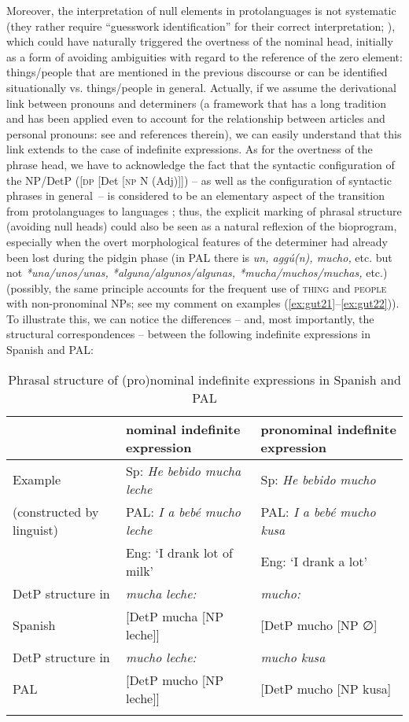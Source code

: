 \documentclass[output=paper,colorlinks,citecolor=brown]{langscibook}
\begin{document}
Moreover, the interpretation of null elements in protolanguages is not systematic (they rather require “guesswork identification” for their correct interpretation; \cite[][169]{Bickerton1990}), which could have naturally triggered the overtness of the nominal head, initially as a form of avoiding ambiguities with regard to the reference of the zero element: things/people that are mentioned in the previous discourse or can be identified situationally vs. things\slash people in general. Actually, if we assume the derivational link between pronouns and determiners (a framework that has a long tradition and has been applied even to account for the relationship between articles and personal pronouns: see \cite[][48--51, 179--191]{Bosque1989} and references therein), we can easily understand that this link extends to the case of indefinite expressions. As for the overtness of the phrase head, we have to acknowledge the fact that the syntactic configuration of the NP/DetP ([\textsc{dp} [Det [\textsc{np} N (Adj)]]) -- as well as the configuration of syntactic phrases in general~-- is considered to be an elementary aspect of the transition from protolanguages to languages \citep[][191]{Bickerton1990}; thus, the explicit marking of phrasal structure (avoiding null heads) could also be seen as a natural reflexion of the bioprogram, especially when the overt morphological features of the determiner had already been lost during the pidgin phase (in PAL there is \textit{un, aggú(n), mucho,} etc. but not \textit{*una/unos/unas, *alguna/algunos/algunas, *mucha/muchos/muchas,} etc.) (possibly, the same principle accounts for the frequent use of \textsc{thing} and \textsc{people} with non-pronominal NPs; see my comment on examples (\ref{ex:gut21}--\ref{ex:gut22})). To illustrate this, we can notice the differences -- and, most importantly, the structural correspondences -- between the following indefinite expressions in Spanish and PAL:


\begin{table}
\small
\begin{tabularx}{\textwidth}{QQQ}
\lsptoprule
           & nominal indefinite expression & pronominal indefinite expression\\
\midrule
Example & Sp: \textit{He bebido mucha leche} & Sp: \textit{He bebido mucho}\\
(constructed by linguist) & PAL: \textit{I a bebé mucho leche} & PAL: \textit{I a bebé mucho kusa}\\
& Eng: ‘I drank lot of milk’ & Eng: ‘I drank a lot’\\
\tablevspace
DetP structure in & \textit{mucha leche:} & \textit{mucho:}\\
Spanish & [DetP mucha [NP leche]] & [DetP mucho [NP ∅]\\
\tablevspace
DetP structure in & \textit{mucho leche:} & \textit{mucho kusa}\\
PAL & [DetP mucho [NP leche]] & [DetP mucho [NP kusa]\\
\lspbottomrule
\end{tabularx}\\
    \caption{Phrasal structure of (pro)nominal indefinite expressions in Spanish and PAL}
    \label{tab:gutmat2}
\end{table}
\end{document}

